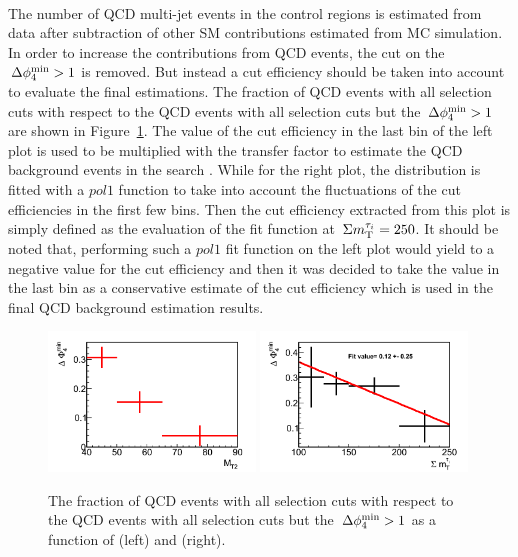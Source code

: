 \\The number of QCD multi-jet events in the control regions is estimated from data after subtraction 
of other SM contributions estimated from MC simulation.
In order to increase the contributions from QCD events, the cut on the $\,{\Delta\phi_{4}^{\rm min}}>1$ is removed.
But instead a cut efficiency should be taken into account to evaluate the final estimations. The 
fraction of QCD events with all selection cuts with respect to the QCD events with all selection 
cuts but the $\,{\Delta\phi_{4}^{\rm min}}>1$ are shown in Figure~\ref{fig:3QCDbg}. The value of the cut efficiency 
in the last bin of the left plot is used to be multiplied with the transfer factor to estimate the 
QCD background events in the search \binone. While for the right plot, the distribution is fitted with a $pol1$ function to 
take into account the fluctuations of the cut efficiencies in the first few bins. Then the cut efficiency extracted from 
this plot is simply defined as the evaluation of the fit function at $\,\Sigma m_{\rm T}^{\tau_i}=250$. It should be noted that, performing such a 
$pol1$ fit function on the left plot would yield to a negative value for the cut efficiency and then it was decided to  
take the value in the last bin as a conservative estimate of the cut efficiency which is used in the final QCD background estimation results. 
\begin{figure}[htbp]
\centering
\includegraphics[width=0.49\textwidth]{QCDbginTauTau/Bin1_miscefficiency.png}
\includegraphics[width=0.49\textwidth]{QCDbginTauTau/Bin2_miscefficiency.png} \\
\caption{ The fraction of QCD events with all selection cuts with respect to the QCD events with all selection 
cuts but the $\,{\Delta\phi_{4}^{\rm min}}>1$ as a function of \mttwo (left) and \SumMT (right).}
\label{fig:3QCDbg}
\end{figure}
